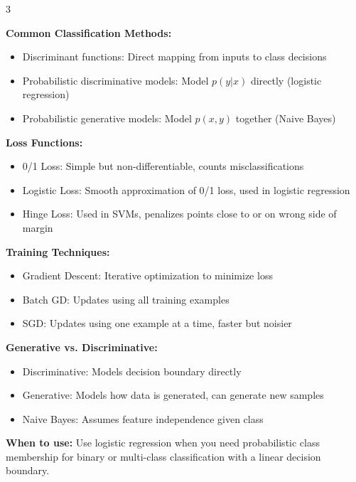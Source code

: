 \documentclass[10pt,landscape]{article}
\begin{document}
\begin{multicols}{3}
\begin{tcolorbox}[breakable, title=2. Classification Concepts, colback=classification]
\textbf{Common Classification Methods:}
\begin{itemize}[leftmargin=*,noitemsep,topsep=0pt]
    \item Discriminant functions: Direct mapping from inputs to class decisions
    \item Probabilistic discriminative models: Model $p(y|x)$ directly (logistic regression)
    \item Probabilistic generative models: Model $p(x,y)$ together (Naive Bayes)
\end{itemize}

\textbf{Loss Functions:}
\begin{itemize}[leftmargin=*,noitemsep,topsep=0pt]
    \item 0/1 Loss: Simple but non-differentiable, counts misclassifications
    \item Logistic Loss: Smooth approximation of 0/1 loss, used in logistic regression
    \item Hinge Loss: Used in SVMs, penalizes points close to or on wrong side of margin
\end{itemize}

\textbf{Training Techniques:}
\begin{itemize}[leftmargin=*,noitemsep,topsep=0pt]
    \item Gradient Descent: Iterative optimization to minimize loss
    \item Batch GD: Updates using all training examples
    \item SGD: Updates using one example at a time, faster but noisier
\end{itemize}

\textbf{Generative vs. Discriminative:}
\begin{itemize}[leftmargin=*,noitemsep,topsep=0pt]
    \item Discriminative: Models decision boundary directly
    \item Generative: Models how data is generated, can generate new samples
    \item Naive Bayes: Assumes feature independence given class
\end{itemize}
\end{tcolorbox}

\begin{tcolorbox}[breakable, title=2.1 Logistic Regression Gradients, colback=classification]
\textbf{When to use:} Use logistic regression when you need probabilistic class membership for binary or multi-class classification with a linear decision boundary.


\end{tcolorbox}
\end{multicols}
\end{document}
